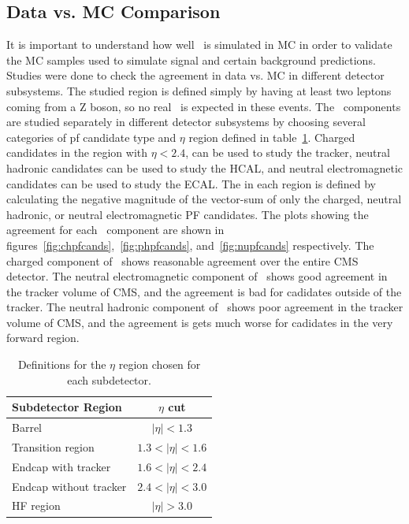 \subsection{Data vs. MC Comparison}
\label{subs:MET_datavsmc}
It is important to understand how well \MET\ is simulated in MC in order to validate the MC samples used to simulate signal and certain background predictions.
Studies were done to check the agreement in data vs. MC in different detector subsystems.
The studied region is defined simply by having at least two leptons coming from a Z boson, so no real \MET\ is expected in these events.
The \MET\ components are studied separately in different detector subsystems by choosing several categories of pf candidate type and $\eta$ region defined in table~\ref{tab:subdetector_eta}.
Charged candidates in the region with $\eta < 2.4$, can be used to study the tracker,
neutral hadronic candidates can be used to study the HCAL,
and neutral electromagnetic candidates can be used to study the ECAL.
The \MET in each region is defined by calculating the negative magnitude of the vector-sum of only the charged, neutral hadronic, or neutral electromagnetic PF candidates.
The plots showing the agreement for each \MET\ component are shown in figures~\ref{fig:chpfcands},~\ref{fig:phpfcands}, and~\ref{fig:nupfcands} respectively. 
The charged  component of \MET\ shows reasonable agreement over the entire CMS detector.
The neutral electromagnetic component of \MET\ shows good agreement in the tracker volume of CMS, and the agreement is bad for cadidates outside of the tracker.
The neutral hadronic component of \MET\ shows poor agreement in the tracker volume of CMS, and the agreement is gets much worse for cadidates in the very forward region.

\begin{table}[htb]
\scriptsize
\begin{center}
\caption{
Definitions for the $\eta$ region chosen for each subdetector.
\label{tab:subdetector_eta}}
\begin{tabular}{l|c}

\hline
Subdetector Region     & $\eta$ cut \\
\hline
Barrel                 & $|\eta| < 1.3$ \\
Transition region      & $1.3 < |\eta| < 1.6$ \\
Endcap with tracker    & $1.6 < |\eta| < 2.4$ \\
Endcap without tracker & $2.4 < |\eta| < 3.0$ \\
HF region              & $|\eta| > 3.0$ \\
\hline
\end{tabular}
\end{center}
\end{table}


